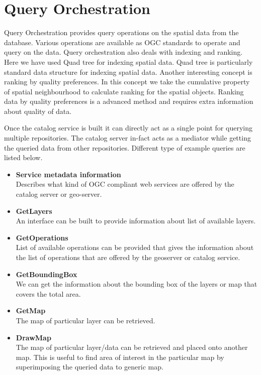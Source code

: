 \section{Query Orchestration}
Query Orchestration provides query operations on the spatial data from the database. Various operations are available as OGC standards to operate and query on the data. Query orchestration also deals with indexing and ranking. Here we have used Quad tree for indexing spatial data. Quad tree\cite{l13} is particularly standard data structure for indexing spatial data. Another interesting concept is ranking by quality preferences\cite{l11}. In this concept we take the cumulative property of spatial neighbourhood to calculate ranking for the spatial objects. Ranking data by quality preferences is a advanced method and requires extra information about quality of data.\\
\par
Once the catalog service is built it can directly act as a single point for querying multiple repositories. The catalog server in-fact acts as a mediator while getting the queried data from other repositories. Different type of example queries are listed below.

\begin{itemize}
\item \textbf{Service metadata information}\\
Describes what kind of OGC compliant web services are offered by the catalog server or geo-server.
\item \textbf{GetLayers}\\
An interface can be built to provide information about list of available layers.
\item \textbf{GetOperations}\\
List of available operations can be provided that gives the information about the list of operations that are offered by the geoserver or catalog service.
\item \textbf{GetBoundingBox}\\
We can get the information about the bounding box of the layers or map that covers the total area.
\item \textbf{GetMap}\\
The map of particular layer can be retrieved.
\item \textbf{DrawMap}\\
The map of particular layer/data can be retrieved and placed onto another map. This is useful to find area of interest in the particular map by superimposing the queried data to generic map.

\end{itemize}